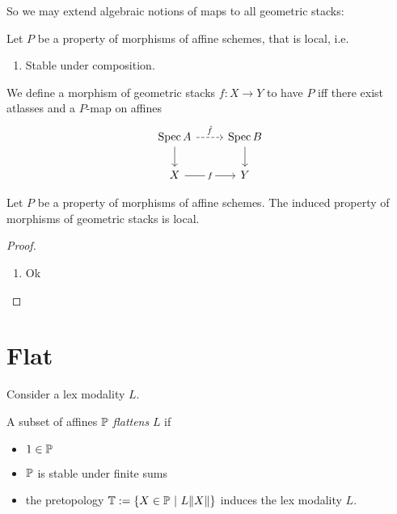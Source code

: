 \documentclass{article}
\begin{document}
So we may extend algebraic notions of maps to all geometric stacks:
\begin{definition}
	Let $P$ be a property of morphisms of affine schemes, that is local, i.e.
	\begin{enumerate}
		\item Stable under composition.
	\end{enumerate}
	
	 We define a morphism of geometric stacks $f : X \to Y$ to have $P$ iff
	there exist atlasses and a $P$-map on affines 
	\[\begin{tikzcd}
		{\Spec A} & {\Spec B} \\
		X & Y
		\arrow["{\hat f}", dashed, from=1-1, to=1-2]
		\arrow[from=1-1, to=2-1]
		\arrow[from=1-2, to=2-2]
		\arrow["f"{description}, from=2-1, to=2-2]
	\end{tikzcd}\]
\end{definition}
\begin{lemma}
	Let $P$  be a property of morphisms of affine schemes. The induced property of morphisms of geometric stacks is local.
\end{lemma}
\begin{proof}
	\begin{enumerate}
		\item Ok
		
	\end{enumerate}
\end{proof}
\section{Flat}
Consider a lex modality $L$.
\begin{definition}
	A subset of affines $\mathbb{P}$ \emph{flattens} $L$ if
	\begin{itemize}
		\item $1 \in \mathbb{P}$
		\item $\mathbb{P}$ is stable under finite sums
		\item 	 the pretopology $\bT := \{ X \in \bP \ | \ L \| X \| \}$ induces the lex modality $L$.
	\end{itemize}

\end{definition}
\end{document}
